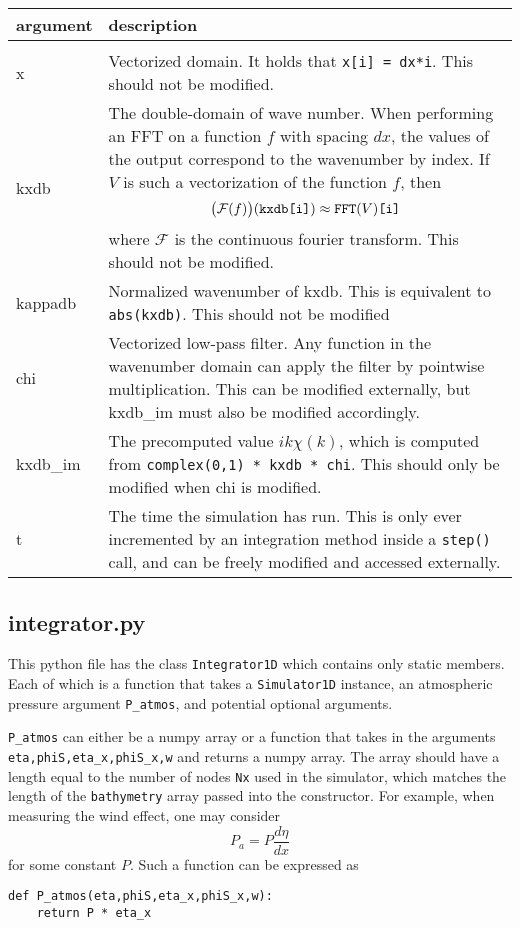 \documentclass[10pt,a4paper]{article}
\newenvironment{arglist}
    {\begin{center}
    \begin{tabular}{l|p{12cm}}
    argument & description\\
    \hline\\
    }
    { 
    \end{tabular} 
    \end{center}
    }
\begin{document}
\begin{arglist}
x & Vectorized domain. It holds that \texttt{x[i] = dx*i}. This should not be modified.\\\hline

kxdb & The double-domain of wave number. When performing an FFT on a function $f$ with spacing $dx$, the values of the output correspond to the wavenumber by index. If $V$ is such a vectorization of the function $f$, then $$\big(\mathcal F(f)\big)(\text{\texttt{kxdb[i]}}) \approx \text{\texttt{FFT}}(V)\text{\texttt{[i]}}$$
where $\mathcal F$ is the continuous fourier transform. This should not be modified.\\\hline

kappadb & Normalized wavenumber of kxdb. This is equivalent to \texttt{abs(kxdb)}. This should not be modified\\\hline

chi & Vectorized low-pass filter. Any function in the wavenumber domain can apply the filter by pointwise multiplication. This can be modified externally, but kxdb\_im must also be modified accordingly.\\\hline

kxdb\_im & The precomputed value $ik \chi(k)$, which is computed from \texttt{complex(0,1) * kxdb * chi}. This should only be modified when chi is modified.\\\hline

t & The time the simulation has run. This is only ever incremented by an integration method inside a \texttt{step()} call, and can be freely modified and accessed externally.

\end{arglist}


\subsection{integrator.py}
This python file has the class \texttt{Integrator1D} which contains only static members. Each of which is a function that takes a \texttt{Simulator1D} instance, an atmospheric pressure argument \texttt{P\_atmos}, and potential optional arguments.

\texttt{P\_atmos} can either be a numpy array or a function that takes in the arguments \texttt{eta,phiS,eta\_x,phiS\_x,w} and returns a numpy array. The array should have a length equal to the number of nodes \texttt{Nx} used in the simulator, which matches the length of the \texttt{bathymetry} array passed into the constructor. For example, when measuring the wind effect, one may consider
$$P_a = P\frac{d\eta}{dx}$$
for some constant $P$. Such a function can be expressed as
\begin{verbatim}
def P_atmos(eta,phiS,eta_x,phiS_x,w):
    return P * eta_x
\end{verbatim}
\end{document}
